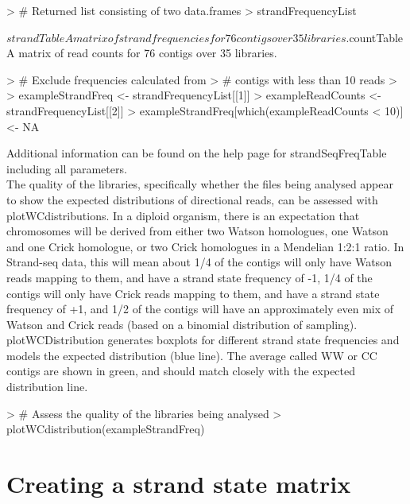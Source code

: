 \documentclass{article}
\begin{document}
\begin{Schunk}
\begin{Sinput}
> # Returned list consisting of two data.frames
> strandFrequencyList
\end{Sinput}
\begin{Soutput}
$strandTable
A matrix of strand frequencies for  76  contigs over  35  libraries.

$countTable
A matrix of read counts for  76  contigs over  35  libraries.
\end{Soutput}
\begin{Sinput}
> # Exclude frequencies calculated from
> # contigs with less than 10 reads
> 
> exampleStrandFreq <- strandFrequencyList[[1]]
> exampleReadCounts <- strandFrequencyList[[2]]
> exampleStrandFreq[which(exampleReadCounts < 10)] <- NA 
\end{Sinput}
\end{Schunk}

Additional information can be found on the help page for strandSeqFreqTable including all parameters.\\

The quality of the libraries, specifically whether the files being analysed appear to show the expected distributions of directional reads, can be assessed with plotWCdistributions.  In a diploid organism, there is an expectation that chromosomes will be derived from either two Watson homologues, one Watson and one Crick homologue, or two Crick homologues in a Mendelian 1:2:1 ratio.  In Strand-seq data, this will mean about 1/4 of the contigs will only have Watson reads mapping to them, and have a strand state frequency of -1, 1/4 of the contigs will only have Crick reads mapping to them, and have a strand state frequency of +1, and 1/2 of the contigs will have an approximately even mix of Watson and Crick reads (based on a binomial distribution of sampling).  plotWCDistribution generates boxplots for different strand state frequencies and models the expected distribution (blue line). The average called WW or CC contigs are shown in green, and should match closely with the expected distribution line.

\begin{Schunk}
\begin{Sinput}
> # Assess the quality of the libraries being analysed
> plotWCdistribution(exampleStrandFreq)
\end{Sinput}
\end{Schunk}

\section{Creating a strand state matrix}
\end{document}
